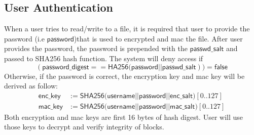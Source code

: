 \documentclass[a4paper,10pt]{article}
\begin{document}
\subsection{User Authentication} %
\label{sub:user_authentication}
When a user tries to read/write to a file, it is required that user to provide the password (i.e $\mathsf{password}$)that is used to encrypted and mac the file.
After user provides the password, the password is prepended with the $\mathsf{passwd\_salt}$ and passed to SHA256 hash function. The system will deny access if $$(\mathsf{password\_digest} == \mathsf{HA256(password||passwd\_salt})) = \mathsf{false}$$
Otherwise, if the password is correct, the encryption key and mac key will be derived as follow:
\begin{equation*}
  \begin{split}
    \mathsf{enc\_key} &:= \mathsf{SHA256(username||password||enc\_salt})[0..127]\\ 
    \mathsf{mac\_key} &:= \mathsf{SHA256(username||password||mac\_salt})[0..127]
  \end{split}
\end{equation*}
Both encryption and mac keys are first 16 bytes of hash digest.
User will use those keys to decrypt and verify integrity of blocks.
\end{document}
